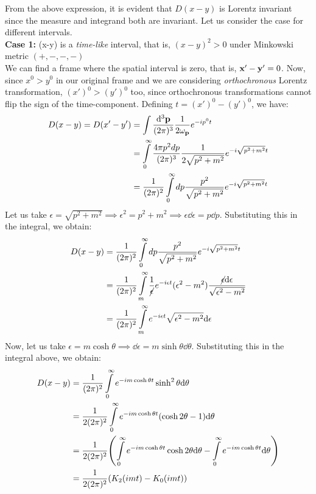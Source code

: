 From the above expression, it is evident that $D(x-y)$ is Lorentz invariant since the measure and integrand both are invariant. Let us consider the case for different intervals. \\[0.2cm]
\textbf{Case 1: } (x-y) is a \textit{time-like} interval, that is, $(x-y)^2>0$ under Minkowski metric $(+,-,-,-)$\\[0.2cm]
We can find a frame where the spatial interval is zero, that is, $\vb{x}'-\vb{y}' = 0$. Now, since $x^0>y^0$ in our original frame and we are considering \textit{orthochronous} Lorentz transformation, $(x')^0>(y')^0$ too, since orthochronous transformations cannot flip the sign of the time-component. Defining $t = (x')^0-(y')^0$, we have:
\begin{align*}
    D(x-y) = D(x'-y') &= \int \frac{\dd^3\vb{{\vb{p}}}}{(2\pi)^3}\frac{1}{2\omega_{\vb{{p}}}} e^{-i p^0t}\\
    &=\int\limits_{0}^\infty \frac{4\pi p^2 dp}{(2\pi)^3}\frac{1}{2\sqrt{p^2+m^2}} e^{-i\sqrt{p^2+m^2}t}\\
    &=\frac{1}{(2\pi)^2}\int\limits_{0}^\infty dp \frac{p^2}{\sqrt{p^2+m^2}} e^{-i\sqrt{p^2+m^2}t}
\end{align*}
Let us take $\epsilon = \sqrt{p^2+m^2} \implies \epsilon^2 = p^2+m^2 \implies \epsilon \dd\epsilon =p\dd p$. Substituting this in the integral, we obtain:
\begin{align*}
    D(x-y) &= \frac{1}{(2\pi)^2}\int\limits_{0}^\infty dp \frac{p^2}{\sqrt{p^2+m^2}} e^{-i\sqrt{p^2+m^2}t}\\
    &= \frac{1}{(2\pi)^2}\int\limits_m^\infty \frac{1}{\cancel{\epsilon}}e^{-i\epsilon t} (\epsilon^2-m^2)\frac{\cancel{\epsilon}\dd\epsilon}{\sqrt{\epsilon^2-m^2}}\\
    &= \frac{1}{(2\pi)^2}\int\limits_m^\infty e^{-i\epsilon t} \sqrt{\epsilon^2-m^2}{\dd\epsilon}
\end{align*}
Now, let us take $\epsilon = m\cosh\theta\implies \dd\epsilon = m \sinh\theta \dd\theta$. Substituting this in the integral above, we obtain:
\begin{align*}
    D(x-y) &= \frac{1}{(2\pi)^2}\int\limits_0^\infty e^{-im\cosh\theta t} \sinh^2\theta\dd\theta \\
    &=\frac{1}{2(2\pi)^2}\int\limits_0^\infty e^{-im\cosh\theta t} \qty(\cosh 2\theta -1)\dd\theta\\
    &=\frac{1}{2(2\pi)^2}\qty(\int\limits_0^\infty e^{-im\cosh\theta t} \cosh 2\theta \dd\theta -\int\limits_0^\infty e^{-im\cosh\theta t} \dd\theta ) \\
    &=\frac{1}{2(2\pi)^2} \qty(K_2(imt) - K_0(imt))
\end{align*}
